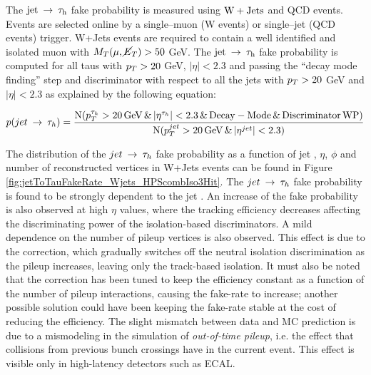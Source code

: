The $\rm{jet} \:\rightarrow\: \tau_h$ fake probability is measured using $\mathrm{W}+\rm{Jets}$ and QCD events. Events are selected online by a single--muon (W events) or single--jet (QCD events) trigger. W+Jets events are required to contain a well identified and isolated muon with $M_T(\mu, \cancel{E}_T) > 50$ GeV. The $\rm{jet} \:\rightarrow\: \tau_h$ fake probability is computed for all taus with $p_{T} > 20$ GeV, $|\eta| < 2.3$ and passing the ``decay mode finding'' step and discriminator with respect to all the jets with $p_{T} > 20$ GeV and $|\eta| < 2.3$ as explained by the following equation:

\begin{equation}
 p(jet \:\rightarrow\: \tau_h) = \dfrac{\operatorname{N}(p_{T}^{\tau_h} > 20\, \mathrm{GeV} \, \& \, |\eta^{\tau_h}| < 2.3 \, \& \, \mathrm{Decay-Mode} \, \& \, \mathrm{Discriminator\,WP})}{\operatorname{N}(p_{T}^{jet} > 20\, \mathrm{GeV} \, \& \, |\eta^{jet}| < 2.3)}
\end{equation}

The distribution of the $jet \:\rightarrow\: \tau_h$ fake probability as a function of jet \pT, $\eta$, $\phi$ and number of reconstructed vertices in W+Jets events can be found in Figure \ref{fig:jetToTauFakeRate_Wjets_HPScombIso3Hit}. The $jet \:\rightarrow\: \tau_h$ fake probability is found to be strongly dependent to the jet \pT. An increase of the fake probability is also observed at high $\eta$ values, where the tracking efficiency decreases affecting the discriminating power of the isolation-based discriminators. A mild dependence on the number of pileup vertices is also observed. This effect is due to the \db correction, which gradually switches off the neutral isolation discrimination as the pileup increases, leaving only the track-based isolation. It must also be noted that the \db correction has been tuned to keep the efficiency constant as a function of the number of pileup interactions, causing the fake-rate to increase; another possible solution could have been keeping the fake-rate stable at the cost of reducing the efficiency. The slight mismatch between data and MC prediction is due to a mismodeling in the simulation of \emph{out-of-time pileup}, i.e. the effect that collisions from previous bunch crossings have in the current event. This effect is visible only in high-latency detectors such as ECAL.

